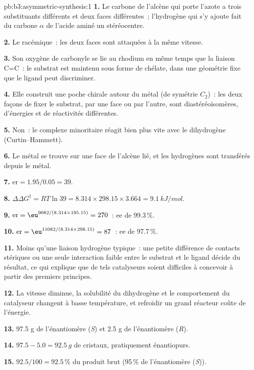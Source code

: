 \begin{solution}{pb:b3:asymmetric-synthesis:1}
\textbf{1.} Le carbone de l'alcène qui porte l'azote a trois substituants
différents et deux faces différentes~; l'hydrogène qui s'y ajoute fait du carbone $\alpha$ de l'acide
aminé un stéréocentre.

\textbf{2.} Le racémique~: les deux faces sont attaquées à la même vitesse.

\textbf{3.} Son oxygène de carbonyle se lie au rhodium en même temps que la
liaison C=C~: le substrat est maintenu sous forme de chélate, dans une
géométrie fixe que le ligand peut discriminer.

\textbf{4.} Elle construit une poche chirale autour du métal (de symétrie $C_2$)~: les deux façons de
fixer le substrat, par une face ou par l'autre, sont diastéréoisomères,
d'énergies et de réactivités différentes.

\textbf{5.} Non~: le complexe minoritaire réagit bien plus vite avec le dihydrogène (Curtin--Hammett).

\textbf{6.} Le métal se trouve sur une face de l'alcène lié, et les
hydrogènes sont transférés depuis le métal.

\textbf{7.} $\mathrm{er} = 1.95/0.05 = 39$.

\textbf{8.} $\Delta\Delta G^\ddagger = RT\ln 39 = 8.314 \times 298.15 \times 3.664 = \qty{9.1}{kJ/mol}$.

\textbf{9.} $\mathrm{er} = \eu^{9082/(8.314 \times 195.15)} = 270$~: ee de 99.3\,\%.

\textbf{10.} $\mathrm{er} = \eu^{11082/(8.314 \times 298.15)} = 87$~: ee de 97.7\,\%.

\textbf{11.} Moins qu'une liaison hydrogène typique~: une petite différence
de contacts stériques ou une seule interaction faible entre le substrat et
le ligand décide du résultat, ce qui explique que de tels catalyseurs
soient difficiles à concevoir à partir des premiers principes.

\textbf{12.} La vitesse diminue, la solubilité du dihydrogène et le
comportement du catalyseur changent à basse température, et refroidir un
grand réacteur coûte de l'énergie.

\textbf{13.} 97.5 g de l'énantiomère (\textit{S}) et 2.5 g de l'énantiomère (\textit{R}).

\textbf{14.} $97.5 - 5.0 = \qty{92.5}{g}$ de cristaux, pratiquement énantiopurs.

\textbf{15.} $92.5/100 = 92.5$\,\% du produit brut (95\,\% de l'énantiomère (\textit{S})).


\end{solution}
